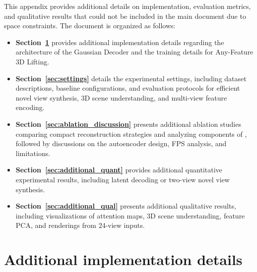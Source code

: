 This appendix provides additional details on implementation, evaluation metrics, and qualitative results that could not be included in the main document due to space constraints. The document is organized as follows:

\begin{itemize}
    \item \textbf{Section~\ref{sec:implementation}} provides additional implementation details regarding the architecture of the Gaussian Decoder and the training details for Any-Feature 3D Lifting.
    \item \textbf{Section~\ref{sec:settings}} details the experimental settings, including dataset descriptions, baseline configurations, and evaluation protocols for efficient novel view synthesis, 3D scene understanding, and multi-view feature encoding.
    \item \textbf{Section~\ref{sec:ablation_discussion}} presents additional ablation studies comparing compact reconstruction strategies and analyzing components of \oursF, followed by discussions on the autoencoder design, FPS analysis, and limitations.
    \item \textbf{Section~\ref{sec:additional_quant}} provides additional quantitative experimental results, including latent decoding or two-view novel view synthesis.
    \item \textbf{Section~\ref{sec:additional_qual}} presents additional qualitative results, including visualizations of attention maps, 3D scene understanding, feature PCA, and renderings from 24-view inputs.
\end{itemize}

\section{Additional implementation details}
\label{sec:implementation}
